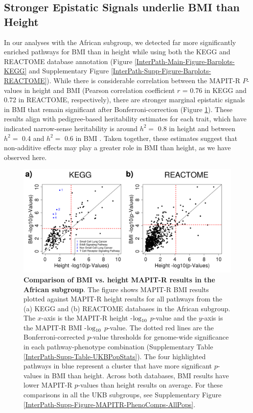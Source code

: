 \documentclass[10pt,a4paper]{article}
\def\log{{\rm log}}
\begin{document}
\subsection*{Stronger Epistatic Signals underlie BMI than Height}

In our analyses with the African subgroup, we detected far more significantly enriched pathways for BMI than in height while using both the KEGG and REACTOME database annotation (Figure \ref{InterPath-Main-Figure-Barplots-KEGG} and Supplementary Figure \ref{InterPath-Supp-Figure-Barplots-REACTOME}). While there is considerable correlation between the MAPIT-R $P$-values in height and BMI (Pearson correlation coefficient $r$ = 0.76 in KEGG and 0.72 in REACTOME, respectively), there are stronger marginal epistatic signals in BMI that remain significant after Bonferroni-correction (Figure \ref{InterPath-Main-Figure-MAPITR-PhenoComps-African}). These results align with pedigree-based heritability estimates for each trait, which have indicated narrow-sense heritability is around $h^2 =$ 0.8 in height and between $h^2 =$ 0.4 and $h^2 =$ 0.6 in BMI \cite{Elks2012,Visscher2012}. Taken together, these estimates suggest that non-additive effects may play a greater role in BMI than height, as we have observed here.

\begin{figure}[htb]
\centering
\includegraphics[scale=.45]{Images/Main/InterPath_Main_Figure_MAPITR_PhenoComps_African_vs4_legend.png}
\caption[TBD]{\textbf{Comparison of BMI vs. height MAPIT-R results in the African subgroup}. The figure shows MAPIT-R BMI results plotted against MAPIT-R height results for all pathways from the (a) KEGG and (b) REACTOME databases in the African subgroup. The $x$-axis is the MAPIT-R height -$\log_{10}$ $p$-value and the $y$-axis is the MAPIT-R BMI -$\log_{10}$ $p$-value. The dotted red lines are the Bonferroni-corrected $p$-value thresholds for genome-wide significance in each pathway-phenotype combination (Supplementary Table \ref{InterPath-Supp-Table-UKBPopStats}). The four highlighted pathways in blue represent a cluster that have more significant $p$-values in BMI than height. Across both databases, BMI results have lower MAPIT-R $p$-values than height results on average. For these comparisons in all the UKB subgroups, see Supplementary Figure \ref{InterPath-Supp-Figure-MAPITR-PhenoComps-AllPops}.}
\label{InterPath-Main-Figure-MAPITR-PhenoComps-African}
\end{figure}
\end{document}
